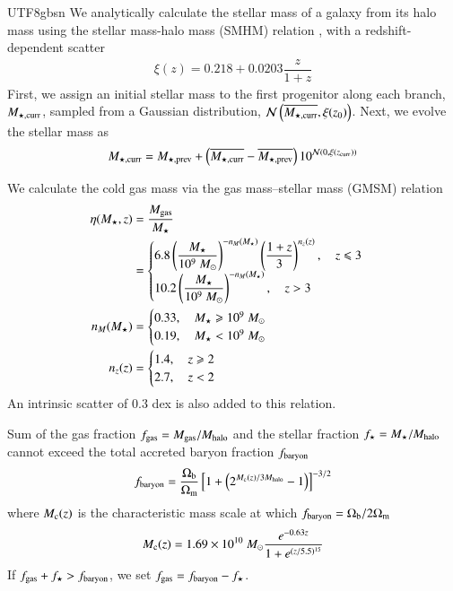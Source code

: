 \documentclass[trackchanges, twocolappendix, twocolumn]{aastex701}
\begin{document}
\begin{CJK*}{UTF8}{gbsn}
We analytically calculate the stellar mass of a galaxy from its halo mass using the stellar mass-halo mass (SMHM) relation \citep{Behroozi+2013SMHM}, with a redshift-dependent scatter
\begin{align}
\xi (z) = 0.218 + 0.0203 \dfrac{z}{1 + z}
\label{eq:z_scatter}
\end{align}
First, we assign an initial stellar mass to the first progenitor along each branch, $M_{\star, \rm curr}$, sampled from a Gaussian distribution, $\mathcal{N} \left( \overline{M_{\star, \rm curr}}, \xi (z_0) \right)$. Next, we evolve the stellar mass as
\begin{align}
M_{\star, \rm curr} = M_{\star, \rm prev}+ \left(\overline{M_{\star, \rm curr}} - \overline{M_{\star, \rm prev}} \right) 10^{\mathcal{N} (0, \xi (z_{\rm curr}))}
\end{align}

We calculate the cold gas mass via the gas mass–stellar mass (GMSM) relation
\begin{align}
\eta (M_\star, z) & = \dfrac{M_{\rm gas}}{M_\star} \notag \\
& = \begin{cases}
6.8 \left( \dfrac{M_\star}{10^{9}~M_\odot} \right)^{- n_M (M_\star)} \left( \dfrac{1 + z}{3} \right)^{n_z (z)}, \quad z \leqslant 3 \\
10.2 \left( \dfrac{M_\star}{10^{9}~M_\odot} \right)^{- n_M (M_\star)}, \quad z > 3
\end{cases} \\
n_M (M_\star) & = \begin{cases}
0.33, \quad M_\star \geqslant 10^9~M_\odot \\
0.19, \quad M_\star < 10^9~M_\odot
\end{cases} \\
n_z (z) & = \begin{cases}
1.4, \quad z \geqslant 2 \\
2.7, \quad z < 2
\end{cases}
\end{align}
An intrinsic scatter of 0.3 dex is also added to this relation.

Sum of the gas fraction $f_{\rm gas} = M_{\rm gas} / M_{\rm halo}$ and the stellar fraction $f_\star = M_\star / M_{\rm halo}$ cannot exceed the total accreted baryon fraction $f_{\rm baryon}$
\begin{align}
f_{\rm baryon} = \dfrac{\Omega_{\rm b}}{\Omega_{\rm m}} \left[ 1+ \left( 2^{M_{\rm c} (z) / 3 M_{\rm halo}} - 1 \right) \right]^{-3/2}
\end{align}
where $M_{\rm c} (z)$ is the characteristic mass scale at which $f_{\rm baryon} = \Omega_{\rm b} / 2 \Omega_{\rm m}$
\begin{align}
M_{\rm c} (z) = 1.69 \times 10^{10}~M_\odot \dfrac{e^{-0.63 z}}{1 + e^{(z / 5.5)^{15}}}
\end{align}
If $f_{\rm gas} + f_\star > f_{\rm baryon}$, we set $f_{\rm gas} = f_{\rm baryon} - f_\star$.


\end{CJK*}
\end{document}

